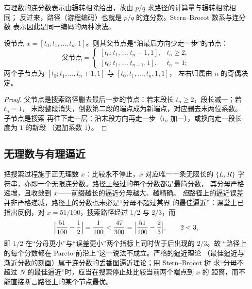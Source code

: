 有理数的连分数表示由辗转相除给出，故由 $p/q$ 求路径的计算量与辗转相除相同；
反过来，路径（游程编码）也就是 $p/q$ 的连分数。Stern--Brocot 数系与连分数
表示因此是同一编码的两种读法。

\begin{corollary}[父节点与子节点的连分数表达]\label{cor:cf-parent}
设节点 $x=[t_0;t_1,\ldots,t_n,1]$。则其父节点是``沿最后方向少走一步''的节点：
\[
  \text{父节点}=
  \begin{cases}
    [t_0;t_1,\ldots,t_n-1,1],& t_n\ge 2,\\[2pt]
    [t_0;t_1,\ldots,t_{n-1},1],& t_n=1;
  \end{cases}
\]
两个子节点为 $[t_0;t_1,\ldots,t_n+1,1]$ 与 $[t_0;t_1,\ldots,t_n,1,1]$，
左右归属由 $n$ 的奇偶决定。
\end{corollary}

\begin{proof}
父节点是搜索路径删去最后一步的节点：若末段长 $t_n\ge2$，段长减一；若 $t_n=1$，
末段整段消失，倒数第二段的端点成为新端点，对应删去末两位系数。子节点是搜索
再往下走一层：沿末段方向再走一步（$t_n$ 加一），或换向走一段长度为 $1$ 的新段
（追加系数 $1$）。
\end{proof}

\subsection{无理数与有理逼近}

\begin{remark}[无限路径与有理逼近]
把搜索过程施于正无理数 $x$：比较永不停止，$x$ 对应唯一一条无限长的
$\{L,R\}$ 字符串，亦即一个无限连分数。路径上经过的每个分数都是最简分数，
其分母严格递增，且收敛到 $x$——前缀越长的逼近分母越大、越精确。
\emph{但}路径上的逼近误差并非严格递减，路径上的分数也未必是``分母不超过某界
的最佳逼近''：课堂上已指出反例，对 $x=51/100$，搜索路径经过 $1/2$ 与 $2/3$，而
\[
  \Bigl|\frac{51}{100}-\frac12\Bigr|=\frac1{100}
  <\frac{47}{300}=\Bigl|\frac{51}{100}-\frac23\Bigr|,
  \qquad 2<3,
\]
即 $1/2$ 在``分母更小''与``误差更小''两个指标上同时优于后出现的 $2/3$。故
``路径上的每个分数都在 Pareto 前沿上''这一说法不成立。严格的逼近理论
（最佳逼近与渐近分数的刻画）属于连分数的丢番图逼近理论；用 Stern--Brocot 树
求``分母不超过 $N$ 的最佳逼近''时，应当在搜索停止处比较当前两个端点到 $x$ 的
距离，而不能直接断言路径上的某个节点最优。
\end{remark}
